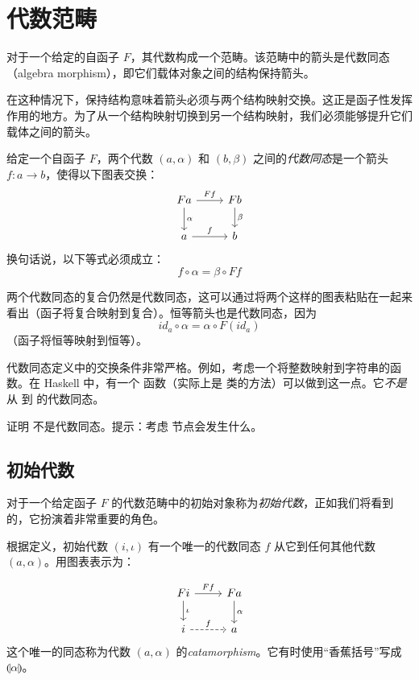 \documentclass[DaoFP]{subfiles}
\begin{document}
\section{代数范畴}

对于一个给定的自函子 $F$，其代数构成一个范畴。该范畴中的箭头是代数同态（algebra morphism），即它们载体对象之间的结构保持箭头。

在这种情况下，保持结构意味着箭头必须与两个结构映射交换。这正是函子性发挥作用的地方。为了从一个结构映射切换到另一个结构映射，我们必须能够提升它们载体之间的箭头。

给定一个自函子 $F$，两个代数 $(a, \alpha)$ 和 $(b, \beta)$ 之间的\emph{代数同态}是一个箭头 $f \colon a \to b$，使得以下图表交换：
\[
 \begin{tikzcd}
 F a 
 \arrow[r, "F f"]
 \arrow[d, "\alpha"]
 & F b
\arrow[d, "\beta"]
 \\
 a
 \arrow[r, "f"]
 & b
  \end{tikzcd}
\]
换句话说，以下等式必须成立：
\[f \circ \alpha = \beta \circ F f \]

两个代数同态的复合仍然是代数同态，这可以通过将两个这样的图表粘贴在一起来看出（函子将复合映射到复合）。恒等箭头也是代数同态，因为
\[ id_a \circ \alpha = \alpha \circ F (id_a) \]
（函子将恒等映射到恒等）。

代数同态定义中的交换条件非常严格。例如，考虑一个将整数映射到字符串的函数。在 Haskell 中，有一个  函数（实际上是  类的方法）可以做到这一点。它\emph{不是}从  到  的代数同态。

\begin{exercise}
证明  不是代数同态。提示：考虑  节点会发生什么。
\end{exercise}

\subsection{初始代数}

对于一个给定函子 $F$ 的代数范畴中的初始对象称为\emph{初始代数}，正如我们将看到的，它扮演着非常重要的角色。

根据定义，初始代数 $(i, \iota)$ 有一个唯一的代数同态 $f$ 从它到任何其他代数 $(a, \alpha)$。用图表表示为：

\[
 \begin{tikzcd}
 F i 
 \arrow[r, "F f"]
 \arrow[d, "\iota"]
 & F a
\arrow[d, "\alpha"]
 \\
 i
 \arrow[r, dashed, "f"]
 & a
  \end{tikzcd}
\]
这个唯一的同态称为代数 $(a, \alpha)$ 的\emph{catamorphism}。它有时使用\index{$\llparenthesis \rrparenthesis$}``香蕉括号''写成 $\llparenthesis \alpha \rrparenthesis$。
\end{document}
